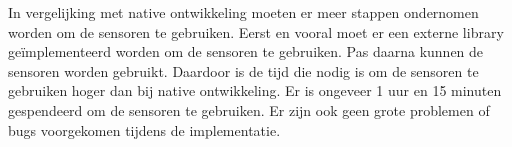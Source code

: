In vergelijking met native ontwikkeling moeten er meer stappen ondernomen worden om de 
sensoren te gebruiken. Eerst en vooral moet er een externe library geïmplementeerd worden 
om de sensoren te gebruiken. Pas daarna kunnen de sensoren worden gebruikt. Daardoor is de tijd die nodig
is om de sensoren te gebruiken hoger dan bij native ontwikkeling. Er is ongeveer
1 uur en 15 minuten gespendeerd om de sensoren te gebruiken. Er zijn ook geen grote problemen of
bugs voorgekomen tijdens de implementatie.
